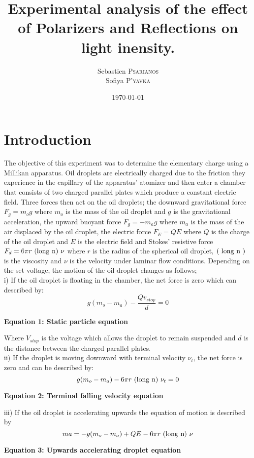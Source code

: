 \documentclass[
	letterpaper, %
	10pt, %
]{CSUniSchoolLabReport}
\title{Experimental analysis of the effect of Polarizers and Reflections on light inensity.}
\author{Sebastien \textsc{Psarianos}\\ Sofiya \textsc{P'yavka}}
\date{\today}
\begin{document}
\maketitle

\section{Introduction}
The objective of this experiment was to determine the elementary charge using a Millikan apparatus.
Oil droplets are electrically charged due to the friction they experience in the capillary of the
apparatus' atomizer and then enter a chamber that consists of two charged  parallel plates which
produce a constant electric field. Three forces then act on the oil droplets; the downward gravitational
force $F_g = m_og$ where $m_o$ is the mass of the oil droplet and $g$ is the gravitational acceleration,
the upward buoyant force $F_g=-m_ag$ where $m_a$ is the mass of the air displaced by the oil droplet,
the electric force $F_E=QE$ where $Q$ is the charge of the oil droplet and $E$ is the electric field and
Stokes' resistive force $F_d=6\pi r {\ \rm (long\ n)\ }\nu$ where $r$ is the radius of the spherical oil
droplet, $({\ \rm long\ n\ })$ is the viscosity and $\nu$ is the velocity under laminar flow conditions.
Depending on the set voltage, the motion of the oil droplet changes as follows;\\

i) If the oil droplet is floating in the chamber, the net force is zero which can described by:
$$g(m_o-m_a)-\frac{Qv_{stop}}{d}=0$$
\begin{center}
    \textbf{Equation 1: Static particle equation}
\end{center}
Where $V_{stop}$ is the voltage which allows the droplet to remain suspended and $d$ is the
distance between the charged parallel plates.\\

ii) If the droplet is moving downward with terminal velocity $\nu_t$, the net force is zero
and can be described by:
$$g(m_o-m_a)-6\pi r {\ \rm (long\ n)\ }\nu_t=0$$
\begin{center}
    \textbf{Equation 2: Terminal falling velocity equation}
\end{center}

iii) If the oil droplet is accelerating upwards the equation of motion is described by
$$ma=-g(m_o-m_a)+QE- 6\pi r {\ \rm (long\ n)\ }\nu$$
\begin{center}
    \textbf{Equation 3: Upwards accelerating droplet equation}
\end{center}
\end{document}
